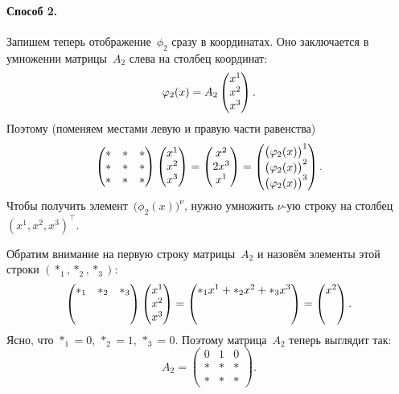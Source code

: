 \begin{solution}
	\paragraph{Способ 2.} Запишем теперь отображение~$\phi_2$ сразу в координатах. Оно заключается в умножении матрицы~$A_2$ слева на столбец координат:
	\[
		\varphi_2(x) =
		A_2
		\begin{pmatrix} x^1 \\ x^2 \\ x^3\end{pmatrix}
		.
	\]
	Поэтому (поменяем местами левую и правую части равенства)
	\[
		\begin{pmatrix}
			* & * & * \\
			* & * & * \\
			* & * & *
		\end{pmatrix}
		\begin{pmatrix}
			x^1 \\ x^2 \\ x^3
		\end{pmatrix}
		=
		\begin{pmatrix}
			x^2 \\ 2x^3 \\ x^1
		\end{pmatrix}
		=
		\begin{pmatrix}
			\bigl( \varphi_2(x) \bigr)^1
			\\
			\bigl( \varphi_2(x) \bigr)^2
			\\
			\bigl( \varphi_2(x) \bigr)^3
		\end{pmatrix}
		.
	\]
	Чтобы получить элемент~$\bigl( \phi_2(x) \bigr)^\nu$, нужно умножить $\nu$-ую строку на столбец $(x^1, x^2, x^3)^\top$.

	Обратим внимание на первую строку матрицы~$A_2$ и назовём элементы этой строки $(*_1, *_2, *_3)$:
	\[
		\begin{pmatrix}
			*_1 & *_2 & *_3
			\\
			{}
			\\
			{}
		\end{pmatrix}
		\begin{pmatrix}
			x^1 \\ x^2 \\ x^3
		\end{pmatrix}
		=
		\begin{pmatrix}
			*_1 x^1 + *_2 x^2 + *_3 x^3
			\\
			{}
			\\
			{}
		\end{pmatrix}
		=
		\begin{pmatrix}
			x^2
			\\
			{}
			\\
			{}
		\end{pmatrix}
		.
	\]
	Ясно, что $*_1 = 0$, $*_2 = 1$, $*_3 = 0$. Поэтому матрица~$A_2$ теперь выглядит так:
	\[
		A_2 =
		\begin{pmatrix}
			0 & 1 & 0 \\
			* & * & * \\
			* & * & *
		\end{pmatrix}
		.
	\]


\end{solution}
